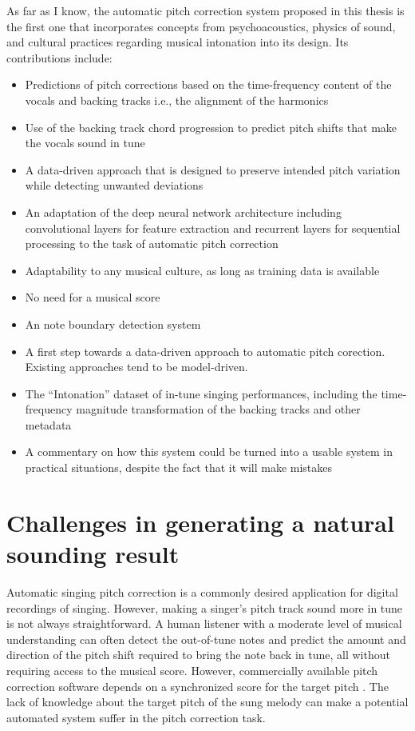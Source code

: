 As far as I know, the automatic pitch correction system proposed in this thesis is the first one that incorporates concepts from psychoacoustics, physics of sound, and cultural practices regarding musical intonation into its design. Its contributions include:
\begin{itemize}
    \item Predictions of pitch corrections based on the time-frequency content of the vocals and backing tracks i.e., the alignment of the harmonics
    \item Use of the backing track chord progression to predict pitch shifts that make the vocals sound in tune
    \item A data-driven approach that is designed to preserve intended pitch variation while detecting unwanted deviations
    \item An adaptation of the deep neural network architecture including convolutional layers for feature extraction and recurrent layers for sequential processing to the task of automatic pitch correction
    \item Adaptability to any musical culture, as long as training data is available
    \item No need for a musical score
    \item An note boundary detection system
    \item A first step towards a data-driven approach to automatic pitch corection. Existing approaches tend to be model-driven.
    \item The ``Intonation'' dataset of in-tune singing performances, including the time-frequency magnitude transformation of the backing tracks and other metadata
    \item A commentary on how this system could be turned into a usable system in practical situations, despite the fact that it will make mistakes
\end{itemize}

\section{Challenges in generating a natural sounding result}

Automatic singing pitch correction is a commonly desired application for digital recordings of singing. However, making a singer's pitch track sound more in tune is not always straightforward. A human listener with a moderate level of musical understanding can often detect the out-of-tune notes and predict the amount and direction of the pitch shift required to bring the note back in tune, all without requiring access to the musical score. However, commercially available pitch correction software depends on a synchronized score for the target pitch \cite{antares:2016}. The lack of knowledge about the target pitch of the sung melody can make a potential automated system suffer in the pitch correction task.

